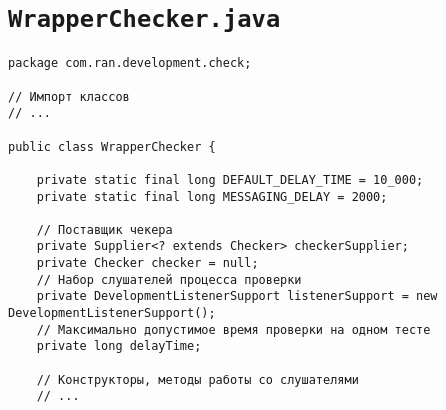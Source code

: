 \section*{\texttt{WrapperChecker.java}}
\begin{verbatim}
package com.ran.development.check;

// Импорт классов
// ...

public class WrapperChecker {

    private static final long DEFAULT_DELAY_TIME = 10_000;
    private static final long MESSAGING_DELAY = 2000;

    // Поставщик чекера
    private Supplier<? extends Checker> checkerSupplier;
    private Checker checker = null;
    // Набор слушателей процесса проверки
    private DevelopmentListenerSupport listenerSupport = new DevelopmentListenerSupport();
    // Максимально допустимое время проверки на одном тесте
    private long delayTime;

    // Конструкторы, методы работы со слушателями
    // ...


\end{verbatim}
